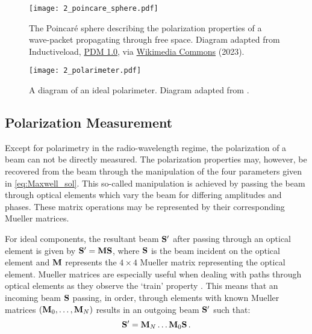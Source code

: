 \begin{figure}[t]
    \centering
    \texttt{[image: 2\_poincare\_sphere.pdf]}
    \caption{
        The Poincar{\'e} sphere describing the polarization properties of a wave-packet propagating through free space.
        Diagram adapted from Inductiveload, \protect\href{https://creativecommons.org/publicdomain/mark/1.0/}{PDM 1.0}, via \protect\href{https://commons.wikimedia.org/wiki/File:Poincaré_sphere.svg}{Wikimedia Commons} (2023).
    }
    \label{fig:poincare}
\end{figure}


\begin{figure}[t]
    \centering
    \texttt{[image: 2\_polarimeter.pdf]}
    \caption{
        A diagram of an ideal polarimeter.
        Diagram adapted from \cite{pol_in_spectra}.
    }
    \label{fig:polarimeter}
\end{figure}

\subsection{Polarization Measurement} \label{subsec:pol_measure}

Except for polarimetry in the radio-wavelength regime, the polarization of a beam can not be directly measured.
The polarization properties may, however, be recovered from the beam through the manipulation of the four parameters given in \autoref{eq:Maxwell_sol}.
This so-called manipulation is achieved by passing the beam through optical elements which vary the beam for differing amplitudes and phases.
These matrix operations may be represented by their corresponding Mueller matrices.

For ideal components, the resultant beam $\mathbf{S}^{\prime}$ after passing through an optical element is given by $\mathbf{S}^{\prime} = \mathbf{M} \mathbf{S}$, where $\mathbf{S}$ is the beam incident on the optical element and $\mathbf{M}$ represents the $4 \times 4$ Mueller matrix representing the optical element.
Mueller matrices are especially useful when dealing with paths through optical elements as they observe the `train' property \citep{Mueller_train}.
This means that an incoming beam $\mathbf{S}$ passing, in order, through elements with known Mueller matrices $(\mathbf{M}_{0}, \dots, \mathbf{M}_{N})$ results in an outgoing beam $\mathbf{S}^{\prime}$ such that:
\begin{equation} \label{eq:mueller_train}
    \mathbf{S}^{\prime} = \mathbf{M}_{N} \dots \mathbf{M}_{0} \mathbf{S}\,.
\end{equation}

